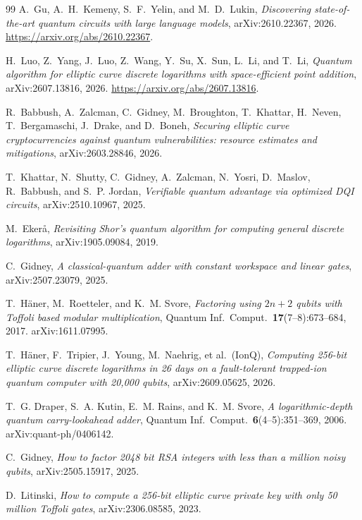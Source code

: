 \documentclass[11pt]{article}
\theoremstyle{plain}
\theoremstyle{remark}
\begin{document}
\begin{thebibliography}{99}
A.~Gu, A.~H.~Kemeny, S.~F.~Yelin, and M.~D.~Lukin,
\emph{Discovering state-of-the-art quantum circuits with large language models},
arXiv:2610.22367, 2026.
\url{https://arxiv.org/abs/2610.22367}.

H.~Luo, Z.~Yang, J.~Luo, Z.~Wang, Y.~Su, X.~Sun, L.~Li, and T.~Li,
\emph{Quantum algorithm for elliptic curve discrete logarithms with
space-efficient point addition}, arXiv:2607.13816, 2026.
\url{https://arxiv.org/abs/2607.13816}.

R.~Babbush, A.~Zalcman, C.~Gidney, M.~Broughton, T.~Khattar, H.~Neven, T.~Bergamaschi, J.~Drake,
and D.~Boneh,
\emph{Securing elliptic curve cryptocurrencies against quantum vulnerabilities: resource estimates
and mitigations},
arXiv:2603.28846, 2026.

T.~Khattar, N.~Shutty, C.~Gidney, A.~Zalcman, N.~Yosri, D.~Maslov, R.~Babbush, and S.~P. Jordan,
\emph{Verifiable quantum advantage via optimized DQI circuits},
arXiv:2510.10967, 2025.

M.~Eker\aa{},
\emph{Revisiting Shor's quantum algorithm for computing general discrete logarithms},
arXiv:1905.09084, 2019.

C.~Gidney,
\emph{A classical-quantum adder with constant workspace and linear gates},
arXiv:2507.23079, 2025.

T.~H\"aner, M.~Roetteler, and K.~M. Svore,
\emph{Factoring using $2n+2$ qubits with Toffoli based modular multiplication},
Quantum Inf.\ Comput.\ \textbf{17}(7--8):673--684, 2017. arXiv:1611.07995.

T.~H\"aner, F.~Tripier, J.~Young, M.~Naehrig, et al.\ (IonQ),
\emph{Computing 256-bit elliptic curve discrete logarithms in 26 days on a fault-tolerant
trapped-ion quantum computer with 20,000 qubits},
arXiv:2609.05625, 2026.

T.~G. Draper, S.~A. Kutin, E.~M. Rains, and K.~M. Svore,
\emph{A logarithmic-depth quantum carry-lookahead adder},
Quantum Inf.\ Comput.\ \textbf{6}(4--5):351--369, 2006. arXiv:quant-ph/0406142.

C.~Gidney,
\emph{How to factor 2048 bit RSA integers with less than a million noisy qubits},
arXiv:2505.15917, 2025.

D.~Litinski,
\emph{How to compute a 256-bit elliptic curve private key with only 50 million Toffoli gates},
arXiv:2306.08585, 2023.


\end{thebibliography}
\end{document}
